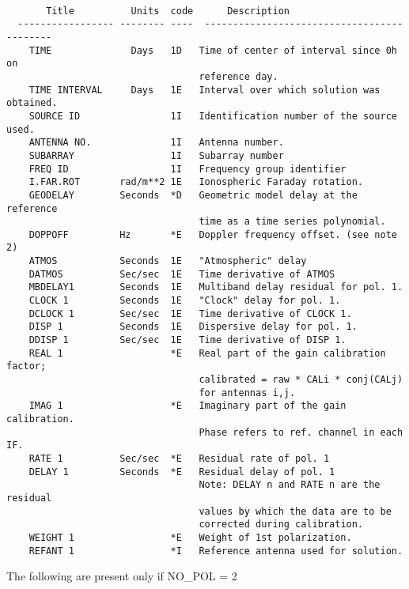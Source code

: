 \begin{verbatim}

       Title          Units  code      Description
  ----------------- -------- ----  -------------------------------------------
    TIME              Days   1D   Time of center of interval since 0h on
                                  reference day.
    TIME INTERVAL     Days   1E   Interval over which solution was obtained.
    SOURCE ID                1I   Identification number of the source used.
    ANTENNA NO.              1I   Antenna number.
    SUBARRAY                 1I   Subarray number
    FREQ ID                  1I   Frequency group identifier
    I.FAR.ROT       rad/m**2 1E   Ionospheric Faraday rotation.
    GEODELAY        Seconds  *D   Geometric model delay at the reference
                                  time as a time series polynomial.
    DOPPOFF         Hz       *E   Doppler frequency offset. (see note 2)
    ATMOS           Seconds  1E   "Atmospheric" delay
    DATMOS          Sec/sec  1E   Time derivative of ATMOS
    MBDELAY1        Seconds  1E   Multiband delay residual for pol. 1.
    CLOCK 1         Seconds  1E   "Clock" delay for pol. 1.
    DCLOCK 1        Sec/sec  1E   Time derivative of CLOCK 1.
    DISP 1          Seconds  1E   Dispersive delay for pol. 1.
    DDISP 1         Sec/sec  1E   Time derivative of DISP 1.
    REAL 1                   *E   Real part of the gain calibration factor;
                                  calibrated = raw * CALi * conj(CALj)
                                  for antennas i,j.
    IMAG 1                   *E   Imaginary part of the gain calibration.
                                  Phase refers to ref. channel in each IF.
    RATE 1          Sec/sec  *E   Residual rate of pol. 1
    DELAY 1         Seconds  *E   Residual delay of pol. 1
                                  Note: DELAY n and RATE n are the residual
                                  values by which the data are to be
                                  corrected during calibration.
    WEIGHT 1                 *E   Weight of 1st polarization.
    REFANT 1                 *I   Reference antenna used for solution.

\end{verbatim}
The following are present only if NO\_POL = 2

